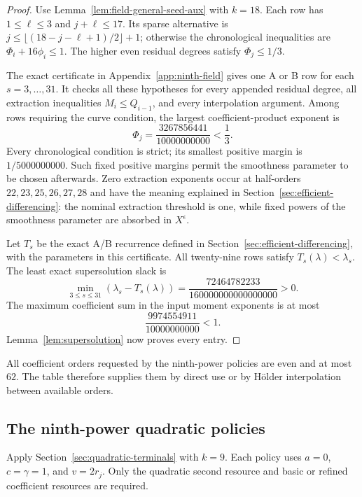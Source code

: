\documentclass[11pt]{amsart}
\theoremstyle{definition}
\numberwithin{equation}{section}
\begin{document}
\begin{proof}
Use Lemma~\ref{lem:field-general-seed-aux} with $k=18$.
Each row has $1\le\ell\le3$ and $j+\ell\le17$.
Its sparse alternative is $j\le\lfloor(18-j-\ell+1)/2\rfloor+1$;
otherwise the chronological inequalities are $\Phi_i+16\phi_i\le1$.
The higher even residual degrees satisfy $\Phi_j\le1/3$.

The exact certificate in Appendix~\ref{app:ninth-field} gives one A or B row for each
$s=3,\ldots,31$. It checks all these hypotheses for every appended
residual degree, all extraction inequalities $M_i\le Q_{i-1}$, and
every interpolation argument. Among rows requiring the curve condition,
the largest coefficient-product exponent is
\[
 \Phi_j=\frac{3267856441}{10000000000}<\frac13.
\]
Every chronological condition is strict; its smallest positive margin is
$1/5000000000$. Such fixed positive margins permit the smoothness
parameter to be chosen afterwards. Zero extraction exponents occur at
half-orders $22,23,25,26,27,28$ and have the meaning explained in
Section~\ref{sec:efficient-differencing}: the nominal extraction threshold is one,
while fixed powers of the smoothness parameter are absorbed in
$X^\epsilon$.

Let $T_s$ be the exact A/B recurrence defined in
Section~\ref{sec:efficient-differencing}, with the parameters in this
certificate. All twenty-nine rows satisfy $T_s(\lambda)<\lambda_s$.
The least exact supersolution slack is
\[
 \min_{3\le s\le31}(\lambda_s-T_s(\lambda))
    =\frac{72464782233}{160000000000000000}>0.
\]
The maximum coefficient sum in the input moment exponents is at most
\[
                    \frac{9974554911}{10000000000}<1.
\]
Lemma~\ref{lem:supersolution} now proves every entry.
\end{proof}

All coefficient orders requested by the ninth-power policies are
even and at most $62$. The table therefore supplies them by direct use
or by H\"older interpolation between available orders.


\subsection{The ninth-power quadratic policies}
Apply Section~\ref{sec:quadratic-terminals} with $k=9$.
Each policy uses $a=0$, $c=\gamma=1$, and $v=2r_j$.
Only the quadratic second resource and basic or refined coefficient
resources are required.
\end{document}
